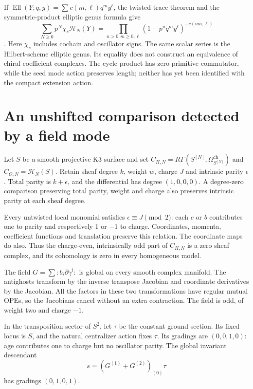 If $\operatorname{Ell}(Y;q,y)=\sum c(m,\ell)q^my^\ell$,
the twisted trace theorem and the symmetric-product
elliptic genus formula give
\begin{equation}\label{cyprim:eq:DMVV}
 \sum_{N\ge0}p^N\chi_s\mathcal H_N(Y)
 =\prod_{n>0,m\ge0,\ell}
       (1-p^nq^my^\ell)^{-c(nm,\ell)}
\end{equation}
\cite[Theorem~6.1]{rewriteFS2007}
\cite[Corollary~6.7]{rewriteBL2005}.
Here $\chi_s$ includes cochain and oscillator signs.
The same scalar series is the Hilbert-scheme elliptic
genus. Its equality does not construct an equivalence
of chiral coefficient complexes. The cycle product
has zero primitive commutator, while the seed mode
action preserves length; neither has yet been
identified with the compact extension action.

\section{An unshifted comparison detected by a field mode}
\label{cyprim:sec:McKay}

Let $S$ be a smooth projective K3 surface and set
$C_{H,N}=R\Gamma(S^{[N]},\Omega_{S^{[N]}}^{\mathrm{ch}})$
and $C_{O,N}=\mathcal H_N(S)$. Retain sheaf degree
$k$, weight $w$, charge $J$ and intrinsic parity
$\epsilon$. Total parity is $k+\epsilon$, and the
differential has degree $(1,0,0,0)$. A degree-zero
comparison preserving total parity, weight and
charge also preserves intrinsic parity at each
sheaf degree.

Every untwisted local monomial satisfies
$\epsilon\equiv J\pmod2$: each $c$ or $b$ contributes
one to parity and respectively $1$ or $-1$ to charge.
Coordinates, momenta, coefficient functions and
translation preserve this relation. The coordinate
maps do also. Thus the charge-even, intrinsically
odd part of $C_{H,N}$ is a zero sheaf complex, and
its cohomology is zero in every homogeneous model.

The field $G=\sum:b_i\partial\gamma^i:$ is global
on every smooth complex manifold. The antighosts
transform by the inverse transpose Jacobian and
coordinate derivatives by the Jacobian. All the
factors in these two transformations have regular
mutual OPEs, so the Jacobians cancel without an
extra contraction. The field is odd, of weight
two and charge $-1$.

In the transposition sector of $S^2$, let $\tau$
be the constant ground section. Its fixed locus
is $S$, and the natural centralizer action fixes
$\tau$. Its gradings are $(0,0,1,0)$: age contributes
one to charge but no oscillator parity. The global
invariant descendant
\begin{equation}\label{cyprim:eq:McKay-state}
 s=(G^{(1)}+G^{(2)})_{(0)}\tau
\end{equation}
has gradings $(0,1,0,1)$.

